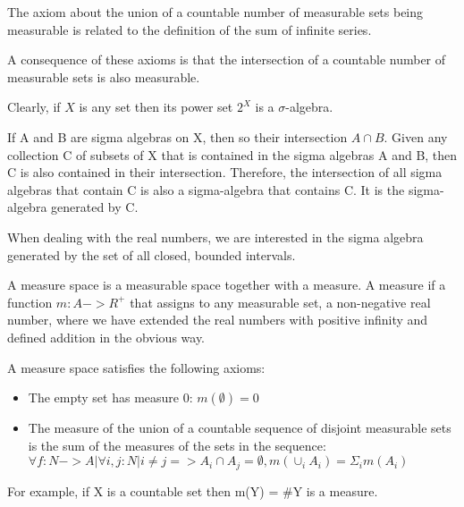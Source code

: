 \documentclass{article}
\begin{document}
The axiom about the union of a countable number of measurable sets being measurable is related to the definition of the sum of infinite series.

A consequence of these axioms is that the intersection of a countable number of measurable sets is also measurable.

Clearly, if $X$ is any set then its power set $2^X$ is a $\sigma$-algebra.

If A and B are sigma algebras on X, then so their intersection $A \cap B$.
Given any collection C of subsets of X that is contained in the sigma algebras A and B, then C is also contained in their intersection.
Therefore, the intersection of all sigma algebras that contain C is also a sigma-algebra that contains C. It is the sigma-algebra generated by C.

When dealing with the real numbers, we are interested in the sigma algebra generated by the set of all closed, bounded intervals. 

A measure space is a measurable space together with a measure. 
A measure if a function $m: A -> R^{+}$ that assigns to any measurable set, a non-negative real number, where we have extended the real numbers with positive infinity and defined addition in the obvious way.

A measure space satisfies the following axioms:

\begin{itemize}
\item The empty set has measure 0: $m(\emptyset) = 0$
\item The measure of the union of a countable sequence of disjoint measurable sets is the sum of the measures of the sets in the sequence: $\forall f: N -> A | \forall i, j : N | i \neq j => A_i \cap A_j = \emptyset, m(\cup_i A_i) = \Sigma_i m(A_i)$
\end{itemize}

For example, if X is a countable set then m(Y) = \#Y is a measure.



\end{document}

